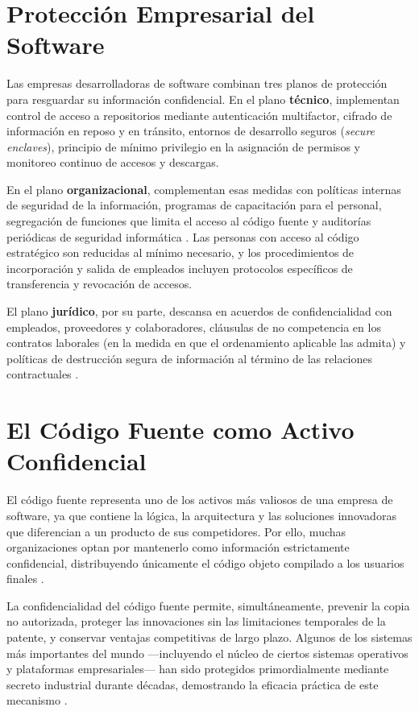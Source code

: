 \documentclass[11pt,a4paper]{report}
\begin{document}
\section{Protección Empresarial del Software}

Las empresas desarrolladoras de software combinan tres planos de protección para resguardar su información confidencial. En el plano \textbf{técnico}, implementan control de acceso a repositorios mediante autenticación multifactor, cifrado de información en reposo y en tránsito, entornos de desarrollo seguros (\textit{secure enclaves}), principio de mínimo privilegio en la asignación de permisos y monitoreo continuo de accesos y descargas.

En el plano \textbf{organizacional}, complementan esas medidas con políticas internas de seguridad de la información, programas de capacitación para el personal, segregación de funciones que limita el acceso al código fuente y auditorías periódicas de seguridad informática \citep{ompi2024}. Las personas con acceso al código estratégico son reducidas al mínimo necesario, y los procedimientos de incorporación y salida de empleados incluyen protocolos específicos de transferencia y revocación de accesos.

El plano \textbf{jurídico}, por su parte, descansa en acuerdos de confidencialidad con empleados, proveedores y colaboradores, cláusulas de no competencia en los contratos laborales (en la medida en que el ordenamiento aplicable las admita) y políticas de destrucción segura de información al término de las relaciones contractuales \citep{indecopi2023}.

\section{El Código Fuente como Activo Confidencial}

El código fuente representa uno de los activos más valiosos de una empresa de software, ya que contiene la lógica, la arquitectura y las soluciones innovadoras que diferencian a un producto de sus competidores. Por ello, muchas organizaciones optan por mantenerlo como información estrictamente confidencial, distribuyendo únicamente el código objeto compilado a los usuarios finales \citep{ompi2024}.

La confidencialidad del código fuente permite, simultáneamente, prevenir la copia no autorizada, proteger las innovaciones sin las limitaciones temporales de la patente, y conservar ventajas competitivas de largo plazo. Algunos de los sistemas más importantes del mundo —incluyendo el núcleo de ciertos sistemas operativos y plataformas empresariales— han sido protegidos primordialmente mediante secreto industrial durante décadas, demostrando la eficacia práctica de este mecanismo \citep{euipo2022}.
\end{document}
